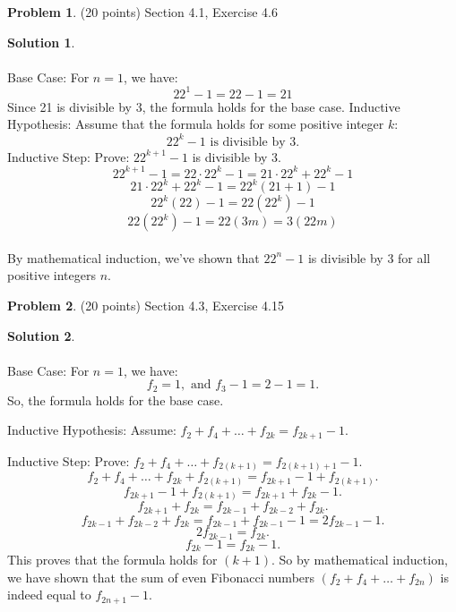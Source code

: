 \documentclass{article}
\theoremstyle{definition}
\newtheorem{problem}{Problem}
\newtheorem*{solution}{Solution}
\begin{document}
\newpage
\begin{problem} (20 points) Section 4.1, Exercise 4.6
\end{problem}
\begin{solution}
  ~\\
  ~\\
  Base Case:
  For \(n = 1\), we have:
  \[
    22^1 - 1 = 22 - 1 = 21
  \]
  Since 21 is divisible by 3, the formula holds for the base case. Inductive
  Hypothesis: Assume that the formula holds for some positive integer \(k\):
  \[
    22^k - 1\text{ is divisible by 3.}
  \]
  Inductive Step: Prove: \(22^{k+1} - 1\) is divisible by 3. 
  \[
    22^{k+1} - 1 = 22 \cdot 22^k - 1 = 21 \cdot 22^k + 22^k - 1
  \]
  \[
    21 \cdot 22^k + 22^k - 1 = 22^k(21 + 1) - 1
  \]
  \[
    22^k(22) - 1 = 22(22^k) - 1
  \]
  \[
    22(22^k) - 1 = 22(3m) = 3(22m)
  \]
  ~\\
  By mathematical induction, we've shown that \(22^n - 1\) is divisible by 3 for all positive integers \(n\).
\end{solution}

\newpage
\begin{problem} (20 points) Section 4.3, Exercise 4.15
\end{problem}
\begin{solution}
  ~\\
  ~\\
  Base Case:
  For \(n = 1\), we have:
  \[
    f_2 = 1, \text{ and } f_3 - 1 = 2 - 1 = 1.
  \]
  So, the formula holds for the base case.

  Inductive Hypothesis: Assume: \(f_2 + f_4 + \ldots + f_{2k} = f_{2k+1} - 1\).

  Inductive Step: Prove: $f_2 + f_4 + \ldots + f_{2(k+1)} = f_{2(k+1)+1} - 1$.
  \[
    f_2 + f_4 + \ldots + f_{2k} + f_{2(k+1)} = f_{2k+1} - 1 + f_{2(k+1)}.
  \]
  \[
    f_{2k+1} - 1 + f_{2(k+1)} = f_{2k+1} + f_{2k} - 1.
  \]
  \[
    f_{2k+1} + f_{2k} = f_{2k-1} + f_{2k-2} + f_{2k}.
  \]
  \[
    f_{2k-1} + f_{2k-2} + f_{2k} = f_{2k-1} + f_{2k-1} - 1 = 2f_{2k-1} - 1.
  \]
  \[
    2f_{2k-1} = f_{2k}.
  \]
  \[
    f_{2k} - 1 = f_{2k} - 1.
  \]
  This proves that the formula holds for $(k + 1)$. So by mathematical induction,
  we have shown that the sum of even Fibonacci numbers $(f_2 + f_4 + \ldots +
    f_{2n})$ is indeed equal to $f_{2n+1} - 1$.
\end{solution}
\end{document}
